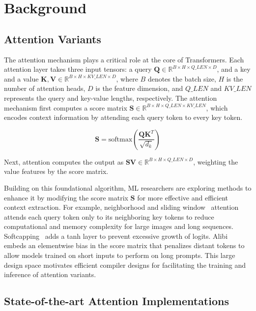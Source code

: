 \section{Background}
\subsection{Attention Variants}
The attention mechanism plays a critical role at the core of Transformers.
Each attention layer takes three input tensors: a query $\mathbf{Q} \in \mathbb{R}^{B \times H \times Q\_LEN \times D}$, and a key and a value $\mathbf{K},\mathbf{V} \in \mathbb{R}^{B \times H \times KV\_LEN \times D}$, where $B$ denotes the batch size, $H$ is the number of attention heads, $D$ is the feature dimension, and $Q\_LEN$ and $KV\_LEN$ represents the query and key-value lengths, respectively. The attention mechanism first computes a score matrix $\mathbf{S} \in \mathbb{R}^{B \times H \times Q\_LEN \times KV\_LEN}$, which encodes context information by attending each query token to every key token.


\begin{equation}
    \mathbf{S} = \text{softmax}(\frac{\mathbf{Q}\mathbf{K}^T}{\sqrt{d_k}})
\end{equation}

Next, attention computes the output as $\mathbf{S}\mathbf{V} \in \mathbb{R}^{B\times H \times Q\_LEN \times D}$, weighting the value features by the score matrix. 

Building on this foundational algorithm, ML researchers are exploring methods to enhance it by modifying the score matrix $\mathbf{S}$ for more effective and efficient context extraction.  For example, neighborhood \cite{NAdeliated} and sliding window~\cite{slidingwindow} attention attends each query token only to its neighboring key tokens to reduce computational and memory complexity for large images and long sequences. Softcapping~\cite{gemma2} adds a tanh layer to prevent excessive growth of logits. Alibi~\cite{alibi} embeds an elementwise bias in the score matrix that penalizes distant tokens to allow models trained on short inputs to perform on long prompts. This large design space motivates efficient compiler designs for facilitating the training and inference of attention variants.
 


\subsection{State-of-the-art Attention Implementations}
\label{sec:sota_attn}

